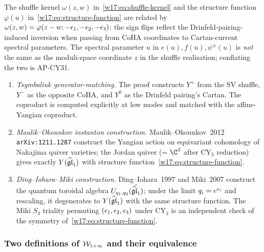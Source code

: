 \begin{remark}
\label{w17:rem:kernel-vs-structure}
The shuffle kernel $\omega(z, w)$ in~\eqref{w17:eq:shuffle-kernel} and the
structure function $\varphi(u)$ in~\eqref{w17:eq:structure-function} are related
by $\omega(z, w) = \varphi(z - w; -\epsilon_1, -\epsilon_2, -\epsilon_3)$: the sign flips
reflect the Drinfeld-pairing-induced inversion when passing from CoHA coordinates
to Cartan-current spectral parameters. The spectral parameter $u$ in $e(u), f(u),
\psi^\pm(u)$ is \emph{not} the same as the moduli-space coordinate $z$ in the
shuffle realisation; conflating the two is AP-CY31.
\end{remark}

\begin{verification}
\label{w17:verif:tsymbaliuk}\mbox{}
\begin{enumerate}
\item \emph{Tsymbaliuk generator-matching.} The proof constructs $Y^+$ from the
SV shuffle, $Y^-$ as the opposite CoHA, and $Y^0$ as the Drinfeld pairing's
Cartan. The coproduct is computed explicitly at low modes and matched with the
affine-Yangian coproduct.
\item \emph{Maulik--Okounkov instanton construction.} Maulik--Okounkov~2012
\texttt{arXiv:1211.1287} construct the Yangian action on equivariant cohomology
of Nakajima quiver varieties; the Jordan quiver (= $\C^3$ after CY$_3$ reduction)
gives exactly $Y(\widehat{\mathfrak{gl}}_1)$ with structure function~\eqref{w17:eq:structure-function}.
\item \emph{Ding--Iohara--Miki construction.} Ding--Iohara~1997 and Miki~2007
construct the quantum toroidal algebra
$U_{q_1, q_2}(\ddot{\widehat{\mathfrak{gl}}_1})$; under the limit $q_i = e^{\epsilon_i}$ and rescaling,
it degenerates to $Y(\widehat{\mathfrak{gl}}_1)$ with the same structure function. The Miki $S_3$
triality permuting $(\epsilon_1, \epsilon_2, \epsilon_3)$ under CY$_3$ is an independent check
of the symmetry of~\eqref{w17:eq:structure-function}.
\end{enumerate}
\end{verification}

\subsubsection{Two definitions of $\mathcal{W}_{1+\infty}$ and their equivalence}
\label{w17:subsubsec:w-infty}

